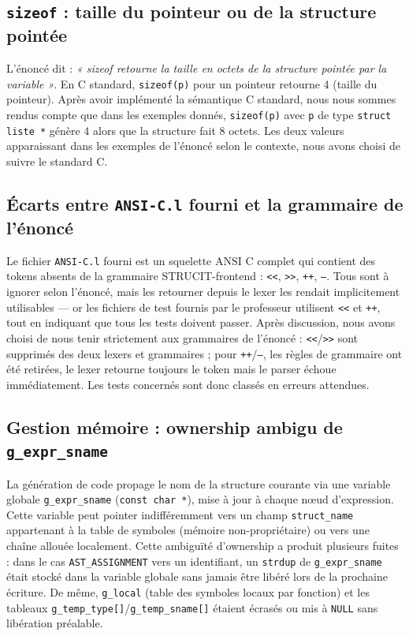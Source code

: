 \documentclass[12pt,a4paper]{article}
\begin{document}
\subsection{\texttt{sizeof} : taille du pointeur ou de la structure pointée}

L'énoncé dit : \textit{« sizeof retourne la taille en octets de la structure pointée par la variable »}. En C standard, \texttt{sizeof(p)} pour un pointeur retourne 4 (taille du pointeur). Après avoir implémenté la sémantique C standard, nous nous sommes rendus compte que dans les exemples donnés, \texttt{sizeof(p)} avec \texttt{p} de type \texttt{struct liste *} génère 4 alors que la structure fait 8 octets. Les deux valeurs apparaissant dans les exemples de l'énoncé selon le contexte, nous avons choisi de suivre le standard C.

\subsection{Écarts entre \texttt{ANSI-C.l} fourni et la grammaire de l'énoncé}

Le fichier \texttt{ANSI-C.l} fourni est un squelette ANSI C complet qui contient des tokens absents de la grammaire STRUCIT-frontend : \texttt{<<}, \texttt{>>}, \texttt{++}, \texttt{--}. Tous sont à ignorer selon l'énoncé, mais les retourner depuis le lexer les rendait implicitement utilisables --- or les fichiers de test fournis par le professeur utilisent \texttt{<<} et \texttt{++}, tout en indiquant que tous les tests doivent passer. Après discussion, nous avons choisi de nous tenir strictement aux grammaires de l'énoncé : \texttt{<<}/\texttt{>>} sont supprimés des deux lexers et grammaires ; pour \texttt{++}/\texttt{--}, les règles de grammaire ont été retirées, le lexer retourne toujours le token mais le parser échoue immédiatement. Les tests concernés sont donc classés en erreurs attendues.

\subsection{Gestion mémoire : ownership ambigu de \texttt{g\_expr\_sname}}

La génération de code propage le nom de la structure courante via une variable globale \texttt{g\_expr\_sname} (\texttt{const char *}), mise à jour à chaque nœud d'expression. Cette variable peut pointer indifféremment vers un champ \texttt{struct\_name} appartenant à la table de symboles (mémoire non-propriétaire) ou vers une chaîne allouée localement. Cette ambiguïté d'ownership a produit plusieurs fuites : dans le cas \texttt{AST\_ASSIGNMENT} vers un identifiant, un \texttt{strdup} de \texttt{g\_expr\_sname} était stocké dans la variable globale sans jamais être libéré lors de la prochaine écriture. De même, \texttt{g\_local} (table des symboles locaux par fonction) et les tableaux \texttt{g\_temp\_type[]}/\texttt{g\_temp\_sname[]} étaient écrasés ou mis à \texttt{NULL} sans libération préalable.
\end{document}
